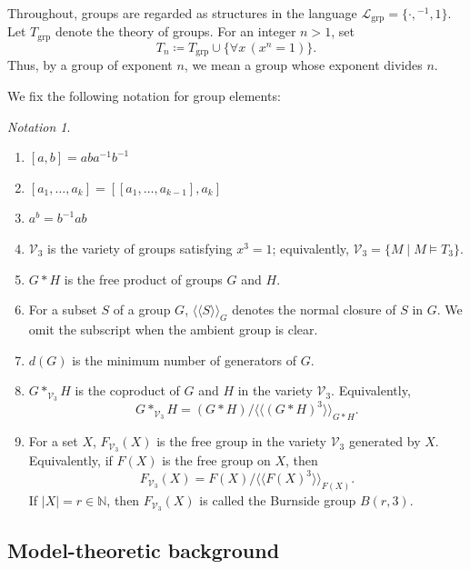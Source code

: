 \documentclass[11pt,reqno]{article}
\theoremstyle{definition}
\theoremstyle{remark}
\newtheorem{notation}[theorem]{Notation}
\newcommand{\llangle}{\langle\!\langle}
\newcommand{\rrangle}{\rangle\!\rangle}
\begin{document}
Throughout, groups are regarded as structures in the language
$\mathcal{L}_{\mathrm{grp}}=\{\cdot,{}^{-1},1\}$.  Let
$T_{\mathrm{grp}}$ denote the theory of groups.  For an integer $n>1$, set
\[
T_n \coloneqq T_{\mathrm{grp}} \cup \{\forall x\,(x^n=1)\}.
\]
Thus, by a group of exponent $n$, we mean a group whose exponent divides $n$.

We fix the following notation for group elements:
\begin{notation}
    \begin{enumerate}
        \item $[a,b]=aba^{-1}b^{-1}$
        \item $[a_1,\ldots,a_k]=[[a_1,\ldots,a_{k-1}],a_k]$
        \item $a^b=b^{-1}ab$
        \item $\mathcal V_3$ is the variety of groups satisfying $x^3=1$; equivalently, $\mathcal V_3=\{M\mid M\models T_3\}$.
        \item $G*H$ is the free product of groups $G$ and $H$.
        \item For a subset $S$ of a group $G$, $\llangle S\rrangle_G$ denotes
        the normal closure of $S$ in $G$.  We omit the subscript when the
        ambient group is clear.
        \item $d(G)$ is the minimum number of generators of $G$. 
        \item $G*_{\mathcal V_3}H$ is the coproduct of $G$ and $H$ in the
        variety $\mathcal V_3$.  Equivalently,
        \[
        G*_{\mathcal V_3}H
        = (G*H)/\llangle (G*H)^3\rrangle_{G*H}.
        \]
        \item For a set $X$, $F_{\mathcal V_3}(X)$ is the free group in the
        variety $\mathcal V_3$ generated by $X$.  Equivalently, if $F(X)$ is
        the free group on $X$, then
        \[
        F_{\mathcal V_3}(X)
        =F(X)/\llangle F(X)^3\rrangle_{F(X)}.
        \]
        If $|X|=r\in\mathbb N$, then $F_{\mathcal V_3}(X)$ is called the
        Burnside group $B(r,3)$.
    \end{enumerate}
\end{notation}


\subsection{Model-theoretic background}
\end{document}
